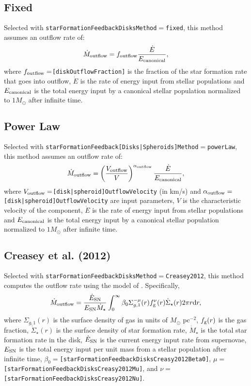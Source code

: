 \subsection{Fixed}

Selected with {\tt starFormationFeedbackDisksMethod}$=${\tt fixed}, this method assumes an outflow rate of:
\begin{equation}
 \dot{M}_{\rm outflow} = f_{\rm outflow} {\dot{E} \over E_{\rm canonical}},
\end{equation}
where $f_{\rm outflow}=${\tt [diskOutflowFraction]} is the fraction of the star formation rate that goes into outflow, $\dot{E}$ is the rate of energy input from stellar populations and $E_{\rm canonical}$ is the total energy input by a canonical stellar population normalized to $1 M_\odot$ after infinite time.

\subsection{Power Law}

Selected with {\tt starFormationFeedback[Disks|Spheroids]Method}$=${\tt powerLaw}, this method assumes an outflow rate of:
\begin{equation}
 \dot{M}_{\rm outflow} = \left({V_{\rm outflow} \over V}\right)^{\alpha_{\rm outflow}} {\dot{E} \over E_{\rm canonical}},
\end{equation}
where $V_{\rm outflow}=${\tt [disk|spheroid]OutflowVelocity} (in km/s) and $\alpha_{\rm outflow}=${\tt [disk|spheroid]OutflowVelocity} are input parameters, $V$ is the characteristic velocity of the component, $\dot{E}$ is the rate of energy input from stellar populations and $E_{\rm canonical}$ is the total energy input by a canonical stellar population normalized to $1 M_\odot$ after infinite time.

\subsection{Creasey et al. (2012)}

Selected with {\tt starFormationFeedbackDisksMethod}$=${\tt Creasey2012}, this method computes the outflow rate using the model of \cite{creasey_how_2012}. Specifically,
\begin{equation}
\dot{M}_{\rm outflow} = {\dot{E}_{\rm SN} \over E_{\rm SN} \dot{M}_\star} \int_0^\infty \beta_0 \Sigma_{g,1}^{-\mu}(r) f_{\rm g}^\nu(r) \dot{\Sigma}_\star(r) 2 \pi r {\rm d}r,
\end{equation}
where $\Sigma_{g,1}(r)$ is the surface density of gas in units of $M_\odot$ pc$^{-2}$, $f_{\rm g}(r)$ is the gas fraction, $\dot{\Sigma}_\star(r)$ is the surface density of star formation rate, $\dot{M}_\star$ is the total star formation rate in the disk, $\dot{E}_{\rm SN}$ is the current energy input rate from supernovae, $E_{\rm SN}$ is the total energy input per unit mass from a stellar population after infinite time, $\beta_0=${\tt [starFormationFeedbackDisksCreasy2012Beta0]}, $\mu=${\tt [starFormationFeedbackDisksCreasy2012Mu]}, and $\nu=${\tt [starFormationFeedbackDisksCreasy2012Nu]}.

